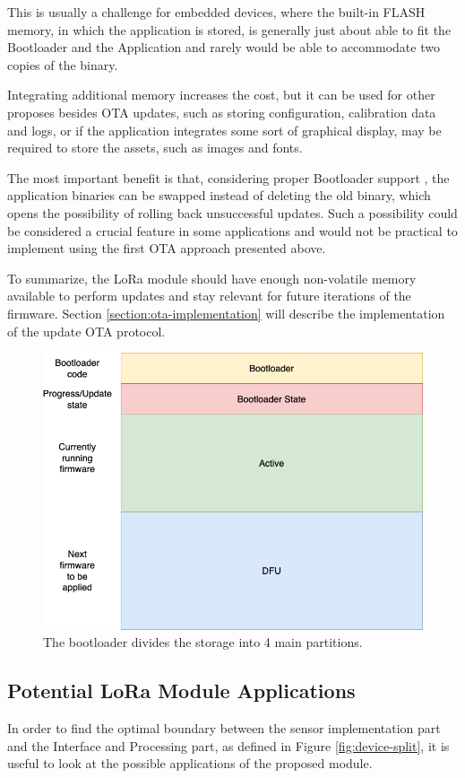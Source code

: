 This is usually a challenge for embedded devices, where the built-in FLASH memory, in which the application is stored, is generally just about able to fit the Bootloader and the Application and rarely would be able to accommodate two copies of the binary.

Integrating additional memory increases the cost, but it can be used for other proposes besides OTA updates, such as storing configuration, calibration data and logs, or if the application integrates some sort of graphical display, may be required to store the assets, such as images and fonts.

The most important benefit is that, considering proper Bootloader support \cite{drogue_iot_firmware_2024,embassy_project_documentation_bootloader_2024}, the application binaries can be swapped instead of deleting the old binary, which opens the possibility of rolling back unsuccessful updates. Such a possibility could be considered a crucial feature in some applications and would not be practical to implement using the first OTA approach presented above.

To summarize, the LoRa module should have enough non-volatile memory available to perform updates and stay relevant for future iterations of the firmware. Section \ref{section:ota-implementation} will describe the implementation of the update OTA protocol.

\begin{figure}
    \includegraphics[width=.6\textwidth]{fig/bootloader_flash.png}
    \caption{\label{fig:bootloader-flash}The bootloader divides the storage into 4 main partitions.}
\end{figure}

\subsection{\label{section:application-case-studies}Potential LoRa Module Applications}
In order to find the optimal boundary between the sensor implementation part and the Interface and Processing part, as defined in Figure \ref{fig:device-split}, it is useful to look at the possible applications of the proposed module.

